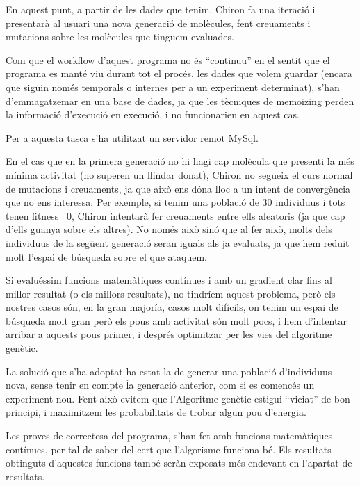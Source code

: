 \documentclass[titlepage,a4paper,12pt]{book}
\begin{document}
En aquest punt, a partir de les dades que tenim, Chiron fa una iteració i
presentarà al usuari una nova generació de molècules, fent creuaments i
mutacions sobre les molècules que tinguem evaluades.

Com que el workflow d'aquest programa no és ``continuu'' en el sentit que el
programa es manté viu durant tot el procés, les dades que volem guardar (encara
que siguin només temporals o internes per a un experiment determinat), s'han
d'emmagatzemar en una base de dades, ja que les tècniques de memoizing %
perden la informació d'execució en execució, i no funcionarien en aquest cas.

Per a aquesta tasca s'ha utilitzat un servidor remot MySql.

En el cas que en la primera generació no hi hagi cap molècula que presenti la
més mínima activitat (no superen un llindar donat), Chiron no segueix el curs
normal de mutacions i creuaments, ja que això ens dóna lloc a un intent de
convergència que no ens interessa.  Per exemple, si tenim una població de 30
individuus i tots tenen fitness ~0, Chiron intentarà fer creuaments entre ells
aleatoris (ja que cap d'ells guanya sobre els altres).  No només això sinó que
al fer això, molts dels individuus de la següent generació seran iguals als ja
evaluats, ja que hem reduit molt l'espai de búsqueda sobre el que ataquem.

Si evaluéssim funcions matemàtiques contínues i amb un gradient clar fins al
millor resultat (o els millors resultats), no tindríem aquest problema, però els
nostres casos són, en la gran majoría, casos molt difícils, on tenim un espai de
búsqueda molt gran però els pous amb activitat són molt pocs, i hem d'intentar
arribar a aquests pous primer, i després optimitzar per les vies del algoritme
genètic.

La solució que s'ha adoptat ha estat la de generar una població d'individuus
nova, sense tenir en compte ĺa generació anterior, com si es comencés un
experiment nou.  Fent això evitem que l'Algoritme genètic estigui ``viciat'' de
bon principi, i maximitzem les probabilitats de trobar algun pou d'energia.

Les proves de correctesa del programa, s'han fet amb funcions matemàtiques
contínues, per tal de saber del cert que l'algorisme funciona bé.  Els resultats
obtinguts d'aquestes funcions també seràn exposats més endevant en l'apartat de
resultats. 
\end{document}
